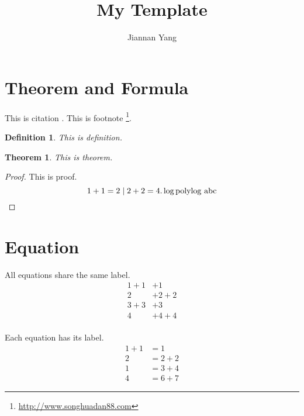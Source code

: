 \documentclass[a4paper]{article}
\title{My Template}
\author{Jiannan Yang}
\newtheorem{definition}{Definition}[section]
\newtheorem{theorem}{Theorem}[section]
\begin{document}
\maketitle

\begin{comment}
\begin{abstract}
This is abstract.
\\
\textbf{Keyword:} abc, def
\end{abstract}
\end{comment}

\section{Theorem and Formula}
This is citation \cite{fan2013making,dwork2012privacy,gray2013consensus,cormen2009introduction}.
This is footnote \footnote{\url{http://www.songhuadan88.com}}.

\begin{definition}
This is definition.
\end{definition}


\begin{theorem}
\label{theorem}
This is theorem.
\end{theorem}

\begin{proof}
This is proof.
\begin{equation}
\label{equation}
1+1=2\mid{}2+2=4.
\log {\rm polylog}\ \text{abc}
\end{equation}
\end{proof}

\section{Equation}
All equations share the same label.
\begin{equation}
\begin{split}
1+1&+1 \\
2&+2+2 \\
3+3&+3 \\
4&+4+4
\end{split}
\end{equation}
\\
Each equation has its label.
\begin{align}
1+1&=1 \\
2&=2+2 \\
1&=3+4 \\
4&=6+7
\end{align}
\end{document}
